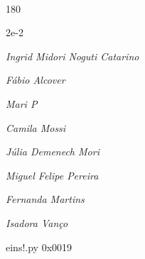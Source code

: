 \documentclass[12pt]{article}
\begin{document}
	\hfill	  	  


\pagebreak			

	\ 
	\vfill
	\begin{turn}{180}	
		\begin{minipage}{\textwidth}
		  	\ttfamily %
			\centering
			{\Huge 2e-2}
		  
			\hfill
		  
			

\textit{\small Ingrid Midori Noguti Catarino}

\textit{\small Fábio Alcover}

\textit{\small Mari P}

\textit{\small Camila Mossi}

\textit{\small Júlia Demenech Mori}

\textit{\small Miguel Felipe Pereira}

\textit{\small Fernanda Martins}

\textit{\small Isadora Vanço}

\bigskip

eins!.py
0x0019


		\end{minipage}	
	\end{turn}
	\vfill
	\

\pagebreak
\end{document}
